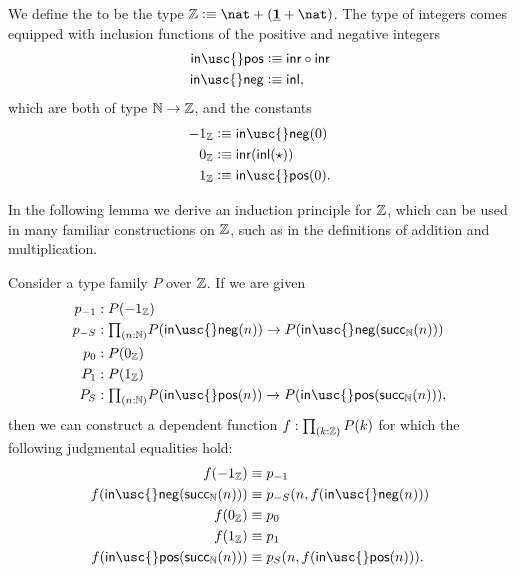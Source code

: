 \begin{defn}
  We define the  to be the type $\Z\defeq\nat+(\unit+\nat)$. The type of integers comes equipped with inclusion functions of the positive and negative integers
  \begin{align*}
    \mathsf{in\usc{}pos} & \defeq \inr\circ\inr \\
    \mathsf{in\usc{}neg} & \defeq \inl,
  \end{align*}
  which are both of type ${\mathbb{N}}\to{\mathbb{Z}}$, and the constants
  \begin{align*}
    -1_\Z & \defeq \mathsf{in\usc{}neg}(0)\\
    0_\Z & \defeq \inr(\inl(\ttt))\\
    1_\Z & \defeq \mathsf{in\usc{}pos}(0).
  \end{align*}
\end{defn}

In the following lemma we derive an induction principle for ${\mathbb{Z}}$, which can be used in many familiar constructions on ${\mathbb{Z}}$, such as in the definitions of addition and multiplication.

\begin{lem}\label{lem:Z_ind}
  Consider a type family $P$ over ${\mathbb{Z}}$. If we are given
  \begin{align*}
    p_{-1} & :P(-1_\Z) \\
    p_{-S} & : \prd{n:\N}P(\mathsf{in\usc{}neg}(n))\to P(\mathsf{in\usc{}neg}(\succN(n)))\\
    p_{0} & : P(0_\Z) \\
    P_{1} & : P(1_\Z) \\
    P_{S} & : \prd{n:\N}P(\mathsf{in\usc{}pos}(n))\to P(\mathsf{in\usc{}pos}(\succN(n))),
  \end{align*}
  then we can construct a dependent function $f:\prd{k:\Z}P(k)$ for which the following judgmental equalities hold:
  \begin{align*}
    f(-1_\Z) & \jdeq p_{-1} \\
    f(\mathsf{in\usc{}neg}(\mathsf{succ}_\N(n))) & \jdeq p_{-S}(n,f(\mathsf{in\usc{}neg}(n))) \\
    f(0_\Z) & \jdeq p_{0} \\
    f(1_\Z) & \jdeq p_{1} \\
    f(\mathsf{in\usc{}pos}(\mathsf{succ}_\N(n))) & \jdeq p_S(n,f(\mathsf{in\usc{}pos}(n))).
  \end{align*}
\end{lem}


